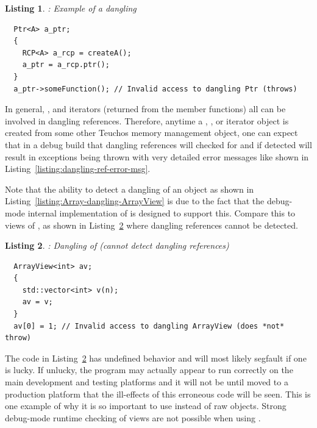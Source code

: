 \documentclass[pdf,ps2pdf,11pt]{SANDreport}
\newtheorem{listing}{Listing}
\begin{document}
\begin{listing}: Example of a dangling {} \\
\label{listing:RCP-dangling-Ptr}
{\small\begin{verbatim}
  Ptr<A> a_ptr;
  {
    RCP<A> a_rcp = createA();
    a_ptr = a_rcp.ptr();
  }
  a_ptr->someFunction(); // Invalid access to dangling Ptr (throws)
\end{verbatim}}
\end{listing}


In general, {}, {} and iterators (returned
from the {} member functions) all can be involved in
dangling references.  Therefore, anytime a {},
{}, or iterator object is created from some other
Teuchos memory management object, one can expect that in a debug build
that dangling references will checked for and if detected will result
in exceptions being thrown with very detailed error messages like
shown in Listing~\ref{listing:dangling-ref-error-msg}.

Note that the ability to detect a dangling {} of an
{} object as shown in
Listing~\ref{listing:Array-dangling-ArrayView} is due to the fact that
the debug-mode internal implementation of {} is designed to
support this.  Compare this to {} views of
{}, as shown in
Listing~\ref{listing:vector-dangling-ArrayView} where dangling
references cannot be detected.


{}\begin{listing}: Dangling {} of {}
(cannot detect dangling references) \\
\label{listing:vector-dangling-ArrayView}
{\small\begin{verbatim}
  ArrayView<int> av;
  {
    std::vector<int> v(n);
    av = v;
  }
  av[0] = 1; // Invalid access to dangling ArrayView (does *not* throw)
\end{verbatim}}
\end{listing}


The code in Listing~\ref{listing:vector-dangling-ArrayView} has
undefined behavior and will most likely segfault if one is lucky.  If
unlucky, the program may actually appear to run correctly on the main
development and testing platforms and it will not be until moved to a
production platform that the ill-effects of this erroneous code will
be seen.  This is one example of why it is so important to use
{} instead of raw {} objects.  Strong
debug-mode runtime checking of {} views are not
possible when using {}.
\end{document}
